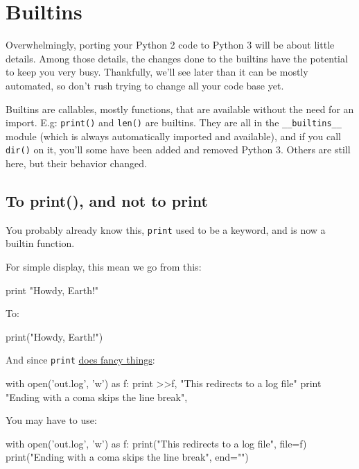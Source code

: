 
\chapter{Builtins}

Overwhelmingly, porting your Python 2 code to Python 3 will be about little details. Among those details, the changes done to the builtins have the potential to keep you very busy. Thankfully, we'll see later than it can be mostly automated, so don't rush trying to change all your code base yet.

Builtins are \glspl{callable}, mostly functions, that are available without the need for an import. E.g: \lstinline{print()} and \lstinline{len()} are builtins. They are all in the \lstinline{__builtins__} module (which is always automatically imported and available), and if you call \lstinline{dir()} on it, you'll some have been added and removed Python 3. Others are still here, but their behavior changed.

\section{To print(), and not to print}

You probably already know this, \lstinline{print} used to be a keyword, and is now a builtin function.

For simple display, this mean we go from this:

\begin{py2}
print "Howdy, Earth!"
\end{py2}


To:

\begin{py3}
print("Howdy, Earth!")
\end{py3}

And since \lstinline{print} \href{https://www.python.org/dev/peps/pep-0214/}{does fancy things}:

\begin{py2}
with open('out.log', 'w') as f:
    print >>f, "This redirects to a log file"
print "Ending with a coma skips the line break",
\end{py2}

You may have to use:

\begin{py3}
with open('out.log', 'w') as f:
    print("This redirects to a log file", file=f)
print("Ending with a coma skips the line break", end="")
\end{py3}

